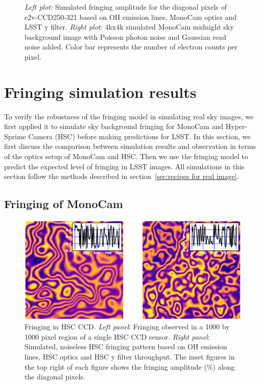 \documentclass[twocolumn]{aastex63} %
\begin{document}
\begin{CJK*}{UTF8}{gbsn}
\begin{figure}[thb] 

\centering
{}
\caption{{\it Left plot:} Simulated fringing amplitude for the diagonal pixels of e2v-CCD250-321 based on OH emission lines, MonoCam optics and LSST y filter. {\it Right plot:} 4kx4k simulated MonoCam midnight sky background image with Poisson photon noise and Gaussian read noise added. Color bar represents the number of electron counts per pixel.}
\label{fig:MonoCam_sims}
\end{figure}


\section{Fringing simulation results} \label{sec:real_sky}
To verify the robustness of the fringing model in simulating real sky images, we first applied it to simulate sky background fringing for MonoCam \citep{Brooks17} and Hyper-Sprime Camera (HSC) \citep{Miyazaki18} before making predictions for LSST. In this section, we first discuss the comparison between simulation results and observation in terms of the optics setup of MonoCam and HSC. Then we use the fringing model to predict the expected level of fringing in LSST images. All simulations in this section follow the methods described in section~\ref{sec:recipes for real image}.



\subsection{Fringing of MonoCam} \label{sec: MonoCam sim}


\begin{figure}[bt]
\centering
\includegraphics[scale = 0.5]{HSC-data-sim.eps}
\caption{Fringing in HSC CCD. {\it Left panel}: Fringing observed in a 1000 by 1000 pixel region of a single HSC CCD sensor. {\it Right panel}: Simulated, noiseless HSC fringing pattern based on OH emission lines, HSC optics and HSC y filter throughput. The inset figures in the top right of each figure shows the fringing amplitude ($\%$) along the diagonal pixels.}
\label{fig:HSC_sims}
\end{figure}


\end{CJK*}
\end{document}
